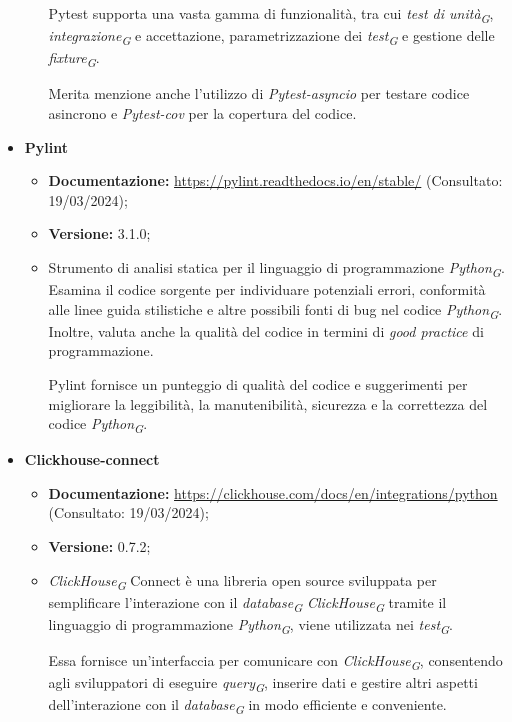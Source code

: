 \begin{itemize}
\begin{itemize}
        Pytest supporta una vasta gamma di funzionalità, tra cui \textit{test di unità}\textsubscript{\textit{G}}, \textit{integrazione}\textsubscript{\textit{G}} e accettazione, parametrizzazione dei \textit{test}\textsubscript{\textit{G}} e gestione delle \textit{fixture}\textsubscript{\textit{G}}.

        Merita menzione anche l'utilizzo di \textit{Pytest-asyncio} per testare codice asincrono e \textit{Pytest-cov} per la copertura del codice.
    \end{itemize}
    
    \item \textbf{Pylint}
    \begin{itemize}
        \item \textbf{Documentazione:} \url{https://pylint.readthedocs.io/en/stable/} (Consultato: 19/03/2024);
        \item \textbf{Versione:} 3.1.0;
        \item Strumento di analisi statica per il linguaggio di programmazione \textit{Python}\textsubscript{\textit{G}}. Esamina il codice sorgente per individuare potenziali errori, conformità alle linee guida stilistiche e altre possibili fonti di bug nel codice \textit{Python}\textsubscript{\textit{G}}. Inoltre, valuta anche la qualità del codice in termini di \textit{good practice} di programmazione.
        
        Pylint fornisce un punteggio di qualità del codice e suggerimenti per migliorare la leggibilità, la manutenibilità, sicurezza e la correttezza del codice \textit{Python}\textsubscript{\textit{G}}.
    \end{itemize}
    
    \item \textbf{Clickhouse-connect}
    \begin{itemize}
        \item \textbf{Documentazione:} \url{https://clickhouse.com/docs/en/integrations/python} (Consultato: 19/03/2024);
        \item \textbf{Versione:} 0.7.2;
        \item \textit{ClickHouse}\textsubscript{\textit{G}} Connect è una libreria open source sviluppata per semplificare l'interazione con il \textit{database}\textsubscript{\textit{G}} \textit{ClickHouse}\textsubscript{\textit{G}} tramite il linguaggio di programmazione \textit{Python}\textsubscript{\textit{G}}, viene utilizzata nei \textit{test}\textsubscript{\textit{G}}.
        
        Essa fornisce un'interfaccia per comunicare con \textit{ClickHouse}\textsubscript{\textit{G}}, consentendo agli sviluppatori di eseguire \textit{query}\textsubscript{\textit{G}}, inserire dati e gestire altri aspetti dell'interazione con il \textit{database}\textsubscript{\textit{G}} in modo efficiente e conveniente.
    \end{itemize}
\end{itemize}
